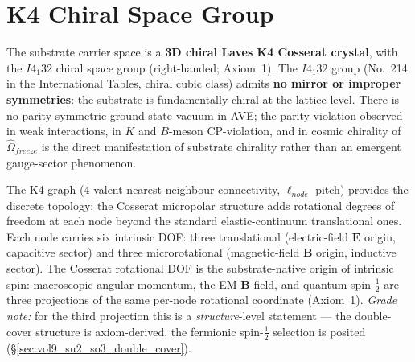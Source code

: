 \section{K4 Chiral Space Group}
\label{sec:vol9_k4_chiral_space_group}

The substrate carrier space is a \textbf{3D chiral Laves K4 Cosserat crystal}, with the $I4_1 32$ chiral space group (right-handed; Axiom~1). The $I4_1 32$ group (No.~214 in the International Tables, chiral cubic class) admits \textbf{no mirror or improper symmetries}: the substrate is fundamentally chiral at the lattice level. There is no parity-symmetric ground-state vacuum in AVE; the parity-violation observed in weak interactions, in $K$ and $B$-meson CP-violation, and in cosmic chirality of $\hat{\Omega}_{freeze}$ is the direct manifestation of substrate chirality rather than an emergent gauge-sector phenomenon.

The K4 graph (4-valent nearest-neighbour connectivity, $\ell_{node}$ pitch) provides the discrete topology; the Cosserat micropolar structure adds rotational degrees of freedom at each node beyond the standard elastic-continuum translational ones. Each node carries six intrinsic DOF: three translational (electric-field $\mathbf{E}$ origin, capacitive sector) and three microrotational (magnetic-field $\mathbf{B}$ origin, inductive sector). The Cosserat rotational DOF is the substrate-native origin of intrinsic spin: macroscopic angular momentum, the EM $\mathbf{B}$ field, and quantum spin-$\tfrac{1}{2}$ are three projections of the same per-node rotational coordinate (Axiom~1). \emph{Grade note:} for the third projection this is a \emph{structure}-level statement --- the double-cover structure is axiom-derived, the fermionic spin-$\tfrac{1}{2}$ selection is posited (\S\ref{sec:vol9_su2_so3_double_cover}).

